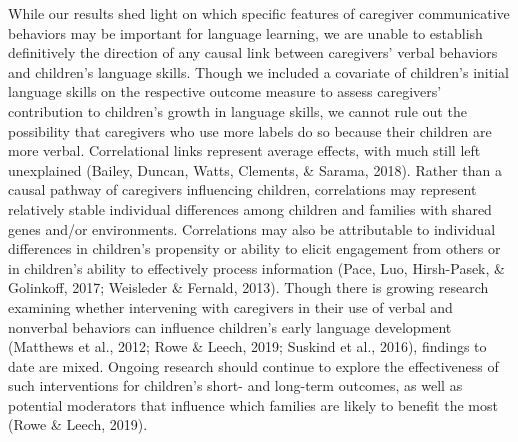 \documentclass[
  man,mask,floatsintext]{apa6}
\begin{document}
While our results shed light on which specific features of caregiver communicative behaviors may be important for language learning, we are unable to establish definitively the direction of any causal link between caregivers' verbal behaviors and children's language skills. Though we included a covariate of children's initial language skills on the respective outcome measure to assess caregivers' contribution to children's growth in language skills, we cannot rule out the possibility that caregivers who use more labels do so because their children are more verbal. Correlational links represent average effects, with much still left unexplained (Bailey, Duncan, Watts, Clements, \& Sarama, 2018). Rather than a causal pathway of caregivers influencing children, correlations may represent relatively stable individual differences among children and families with shared genes and/or environments. Correlations may also be attributable to individual differences in children's propensity or ability to elicit engagement from others or in children's ability to effectively process information (Pace, Luo, Hirsh-Pasek, \& Golinkoff, 2017; Weisleder \& Fernald, 2013). Though there is growing research examining whether intervening with caregivers in their use of verbal and nonverbal behaviors can influence children's early language development (Matthews et al., 2012; Rowe \& Leech, 2019; Suskind et al., 2016), findings to date are mixed. Ongoing research should continue to explore the effectiveness of such interventions for children's short- and long-term outcomes, as well as potential moderators that influence which families are likely to benefit the most (Rowe \& Leech, 2019).
\end{document}
